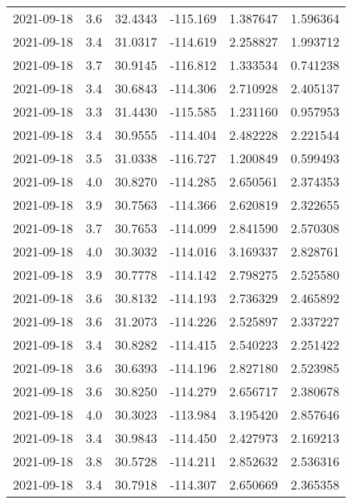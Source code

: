 \begin{tabular}{lrrrrr}
2021-09-18 &       3.6 &  32.4343 &  -115.169 &         1.387647 &         1.596364 \\
2021-09-18 &       3.4 &  31.0317 &  -114.619 &         2.258827 &         1.993712 \\
2021-09-18 &       3.7 &  30.9145 &  -116.812 &         1.333534 &         0.741238 \\
2021-09-18 &       3.4 &  30.6843 &  -114.306 &         2.710928 &         2.405137 \\
2021-09-18 &       3.3 &  31.4430 &  -115.585 &         1.231160 &         0.957953 \\
2021-09-18 &       3.4 &  30.9555 &  -114.404 &         2.482228 &         2.221544 \\
2021-09-18 &       3.5 &  31.0338 &  -116.727 &         1.200849 &         0.599493 \\
2021-09-18 &       4.0 &  30.8270 &  -114.285 &         2.650561 &         2.374353 \\
2021-09-18 &       3.9 &  30.7563 &  -114.366 &         2.620819 &         2.322655 \\
2021-09-18 &       3.7 &  30.7653 &  -114.099 &         2.841590 &         2.570308 \\
2021-09-18 &       4.0 &  30.3032 &  -114.016 &         3.169337 &         2.828761 \\
2021-09-18 &       3.9 &  30.7778 &  -114.142 &         2.798275 &         2.525580 \\
2021-09-18 &       3.6 &  30.8132 &  -114.193 &         2.736329 &         2.465892 \\
2021-09-18 &       3.6 &  31.2073 &  -114.226 &         2.525897 &         2.337227 \\
2021-09-18 &       3.4 &  30.8282 &  -114.415 &         2.540223 &         2.251422 \\
2021-09-18 &       3.6 &  30.6393 &  -114.196 &         2.827180 &         2.523985 \\
2021-09-18 &       3.6 &  30.8250 &  -114.279 &         2.656717 &         2.380678 \\
2021-09-18 &       4.0 &  30.3023 &  -113.984 &         3.195420 &         2.857646 \\
2021-09-18 &       3.4 &  30.9843 &  -114.450 &         2.427973 &         2.169213 \\
2021-09-18 &       3.8 &  30.5728 &  -114.211 &         2.852632 &         2.536316 \\
2021-09-18 &       3.4 &  30.7918 &  -114.307 &         2.650669 &         2.365358 \\

\end{tabular}
